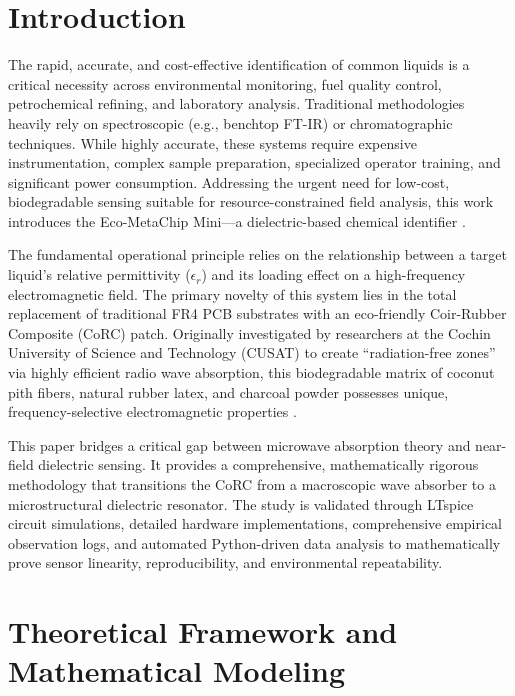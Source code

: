 \documentclass[11pt, a4paper]{article}
\begin{document}
\section{Introduction}
The rapid, accurate, and cost-effective identification of common liquids is a critical necessity across environmental monitoring, fuel quality control, petrochemical refining, and laboratory analysis. Traditional methodologies heavily rely on spectroscopic (e.g., benchtop FT-IR) or chromatographic techniques. While highly accurate, these systems require expensive instrumentation, complex sample preparation, specialized operator training, and significant power consumption. Addressing the urgent need for low-cost, biodegradable sensing suitable for resource-constrained field analysis, this work introduces the Eco-MetaChip Mini---a dielectric-based chemical identifier \cite{b4}.

The fundamental operational principle relies on the relationship between a target liquid's relative permittivity ($\epsilon_r$) and its loading effect on a high-frequency electromagnetic field. The primary novelty of this system lies in the total replacement of traditional FR4 PCB substrates with an eco-friendly Coir-Rubber Composite (CoRC) patch. Originally investigated by researchers at the Cochin University of Science and Technology (CUSAT) to create ``radiation-free zones'' via highly efficient radio wave absorption, this biodegradable matrix of coconut pith fibers, natural rubber latex, and charcoal powder \cite{b7} possesses unique, frequency-selective electromagnetic properties \cite{b1, b2}.

This paper bridges a critical gap between microwave absorption theory and near-field dielectric sensing. It provides a comprehensive, mathematically rigorous methodology that transitions the CoRC from a macroscopic wave absorber to a microstructural dielectric resonator. The study is validated through LTspice circuit simulations, detailed hardware implementations, comprehensive empirical observation logs, and automated Python-driven data analysis to mathematically prove sensor linearity, reproducibility, and environmental repeatability.

\section{Theoretical Framework and Mathematical Modeling}
\end{document}
